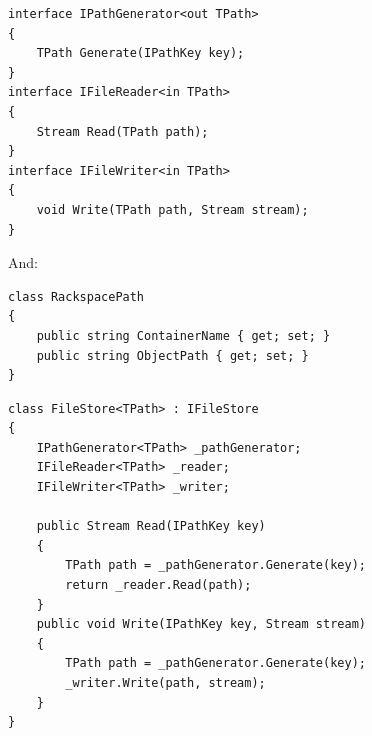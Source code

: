 \documentclass{beamer}
\begin{document}
  \begin{frame}[fragile]
    \begin{verbatim}
interface IPathGenerator<out TPath>
{
    TPath Generate(IPathKey key);
}
interface IFileReader<in TPath>
{
    Stream Read(TPath path);
}
interface IFileWriter<in TPath>
{
    void Write(TPath path, Stream stream);
}
    \end{verbatim}
    And:
    \begin{verbatim}
class RackspacePath
{
    public string ContainerName { get; set; }
    public string ObjectPath { get; set; }
}
    \end{verbatim}
\end{frame}

  \begin{frame}[fragile]
    \begin{verbatim}
class FileStore<TPath> : IFileStore
{
    IPathGenerator<TPath> _pathGenerator;
    IFileReader<TPath> _reader;
    IFileWriter<TPath> _writer;
    
    public Stream Read(IPathKey key)
    {
        TPath path = _pathGenerator.Generate(key);
        return _reader.Read(path);
    }
    public void Write(IPathKey key, Stream stream)
    {
        TPath path = _pathGenerator.Generate(key);
        _writer.Write(path, stream);
    }
}
    \end{verbatim}
\end{frame}
\end{document}
